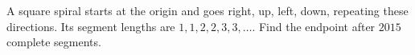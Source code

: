 A square spiral starts at the origin and goes right, up, left, down, repeating these directions. Its segment lengths are $1,1,2,2,3,3,\ldots$. Find the endpoint after $2015$ complete segments.
